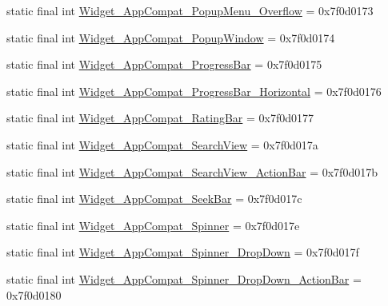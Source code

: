 \begin{DoxyCompactItemize}
\item 
static final int \mbox{\hyperlink{classcom_1_1google_1_1android_1_1gms_1_1R_1_1style_a18c4527a7d583ece1b2c63a61fdd9f58}{Widget\+\_\+\+App\+Compat\+\_\+\+Popup\+Menu\+\_\+\+Overflow}} = 0x7f0d0173
\item 
static final int \mbox{\hyperlink{classcom_1_1google_1_1android_1_1gms_1_1R_1_1style_aabcaec35c32ef3fb8ea73655c002b5cb}{Widget\+\_\+\+App\+Compat\+\_\+\+Popup\+Window}} = 0x7f0d0174
\item 
static final int \mbox{\hyperlink{classcom_1_1google_1_1android_1_1gms_1_1R_1_1style_a72ecfe46d406c1ef7232fdcddaf3bd22}{Widget\+\_\+\+App\+Compat\+\_\+\+Progress\+Bar}} = 0x7f0d0175
\item 
static final int \mbox{\hyperlink{classcom_1_1google_1_1android_1_1gms_1_1R_1_1style_a3a6f20482ac9762117dd67013e653170}{Widget\+\_\+\+App\+Compat\+\_\+\+Progress\+Bar\+\_\+\+Horizontal}} = 0x7f0d0176
\item 
static final int \mbox{\hyperlink{classcom_1_1google_1_1android_1_1gms_1_1R_1_1style_ae3af091eff3a4c94996492c56a9df0bd}{Widget\+\_\+\+App\+Compat\+\_\+\+Rating\+Bar}} = 0x7f0d0177
\item 
static final int \mbox{\hyperlink{classcom_1_1google_1_1android_1_1gms_1_1R_1_1style_aa1bef51aa4b8777c58847b91f55eed04}{Widget\+\_\+\+App\+Compat\+\_\+\+Search\+View}} = 0x7f0d017a
\item 
static final int \mbox{\hyperlink{classcom_1_1google_1_1android_1_1gms_1_1R_1_1style_ac166a1fee812f59bf6894c12bba217e7}{Widget\+\_\+\+App\+Compat\+\_\+\+Search\+View\+\_\+\+Action\+Bar}} = 0x7f0d017b
\item 
static final int \mbox{\hyperlink{classcom_1_1google_1_1android_1_1gms_1_1R_1_1style_aca20b4a943e3bb692c9287bd85340b32}{Widget\+\_\+\+App\+Compat\+\_\+\+Seek\+Bar}} = 0x7f0d017c
\item 
static final int \mbox{\hyperlink{classcom_1_1google_1_1android_1_1gms_1_1R_1_1style_a56bcfe28cca560bee6092f1c2f2894b6}{Widget\+\_\+\+App\+Compat\+\_\+\+Spinner}} = 0x7f0d017e
\item 
static final int \mbox{\hyperlink{classcom_1_1google_1_1android_1_1gms_1_1R_1_1style_a09095017d89fbda49f3c962539881563}{Widget\+\_\+\+App\+Compat\+\_\+\+Spinner\+\_\+\+Drop\+Down}} = 0x7f0d017f
\item 
static final int \mbox{\hyperlink{classcom_1_1google_1_1android_1_1gms_1_1R_1_1style_a249b8e9369973eac161158e0c8980088}{Widget\+\_\+\+App\+Compat\+\_\+\+Spinner\+\_\+\+Drop\+Down\+\_\+\+Action\+Bar}} = 0x7f0d0180
\item 

\end{DoxyCompactItemize}
